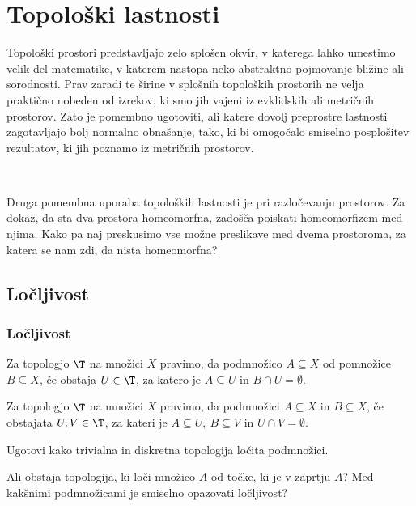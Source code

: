 \section{Topološki lastnosti}

Topološki prostori predstavljajo zelo splošen okvir, v katerega lahko umestimo velik del matematike, v katerem nastopa neko abstraktno pojmovanje bližine ali sorodnosti. Prav zaradi te širine v splošnih topoloških prostorih ne velja praktično nobeden od izrekov, ki smo jih vajeni iz evklidskih ali metričnih prostorov. Zato je pomembno ugotoviti, ali katere dovolj preprostre lastnosti zagotavljajo bolj normalno obnašanje, tako, ki bi omogočalo smiselno posplošitev rezultatov, ki jih poznamo iz metričnih prostorov.

\,

Druga pomembna uporaba topoloških lastnosti je pri razločevanju prostorov. Za dokaz, da sta dva prostora homeomorfna, zadošča poiskati homeomorfizem med njima. Kako pa naj preskusimo vse možne preslikave med dvema prostoroma, za katera se nam zdi, da nista homeomorfna?

\subsection{Ločljivost}
\subsubsection{Ločljivost}
\begin{definicija}
    Za topologjo $\T$ na množici $X$ pravimo, da  podmnožico $A \subseteq X$ od pomnožice $B \subseteq X$, če obstaja $U \in \T$, za katero je $A \subseteq U$ in $B \cap U = \emptyset$.
\end{definicija}

\begin{definicija}
    Za topologjo $\T$ na množici $X$ pravimo, da  podmnožici $A \subseteq X$ in $B \subseteq X$, če obstajata $U, V \in \T$, za kateri je $A \subseteq U, \ B \subseteq V$ in $U \cap V = \emptyset$.
\end{definicija}

\begin{primer}
    Ugotovi kako trivialna in diskretna topologija ločita podmnožici.
\end{primer}

\begin{primer}
    Ali obstaja topologija, ki loči množico $A$ od točke, ki je v zaprtju $A$? Med kakšnimi podmnožicami je smiselno opazovati ločljivost?
\end{primer}

